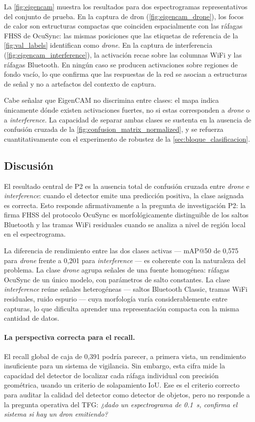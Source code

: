 La \cref{fig:eigencam} muestra los resultados para dos espectrogramas representativos del conjunto de prueba. En la captura de dron (\cref{fig:eigencam_drone}), los focos de calor son estructuras compactas que coinciden espacialmente con las ráfagas FHSS de OcuSync: las mismas posiciones que las etiquetas de referencia de la \cref{fig:val_labels} identifican como \emph{drone}. En la captura de interferencia (\cref{fig:eigencam_interference}), la activación recae sobre las columnas WiFi y las ráfagas Bluetooth. En ningún caso se producen activaciones sobre regiones de fondo vacío, lo que confirma que las respuestas de la red se asocian a estructuras de señal y no a artefactos del contexto de captura.

\FloatBarrier
Cabe señalar que EigenCAM no discrimina entre clases: el mapa indica únicamente dónde existen activaciones fuertes, no si estas corresponden a \emph{drone} o a \emph{interference}. La capacidad de separar ambas clases se sustenta en la ausencia de confusión cruzada de la \cref{fig:confusion_matrix_normalized}, y se refuerza cuantitativamente con el experimento de robustez de la \cref{sec:bloque_clasificacion}.
\subsection{Discusión}
\label{sec:p2_discusion}

El resultado central de P2 es la ausencia total de confusión cruzada entre \emph{drone} e \emph{interference}: cuando el detector emite una predicción positiva, la clase asignada es correcta. Esto responde afirmativamente a la pregunta de investigación P2: la firma FHSS del protocolo OcuSync es morfológicamente distinguible de los saltos Bluetooth y las tramas WiFi residuales cuando se analiza a nivel de región local en el espectrograma.

La diferencia de rendimiento entre las dos clases activas --- mAP@50 de 0,575 para \emph{drone} frente a 0,201 para \emph{interference} --- es coherente con la naturaleza del problema. La clase \emph{drone} agrupa señales de una fuente homogénea: ráfagas OcuSync de un único modelo, con parámetros de salto constantes. La clase \emph{interference} reúne señales heterogéneas --- saltos Bluetooth Classic, tramas WiFi residuales, ruido espurio --- cuya morfología varía considerablemente entre capturas, lo que dificulta aprender una representación compacta con la misma cantidad de datos.

\paragraph{La perspectiva correcta para el recall.}
El recall global de caja de 0,391 podría parecer, a primera vista, un rendimiento insuficiente para un sistema de vigilancia. Sin embargo, esta cifra mide la capacidad del detector de localizar cada ráfaga individual con precisión geométrica, usando un criterio de solapamiento IoU. Ese es el criterio correcto para auditar la calidad del detector como detector de objetos, pero no responde a la pregunta operativa del TFG: \emph{¿dado un espectrograma de \SI{0,1}{\second}, confirma el sistema si hay un dron emitiendo?}

